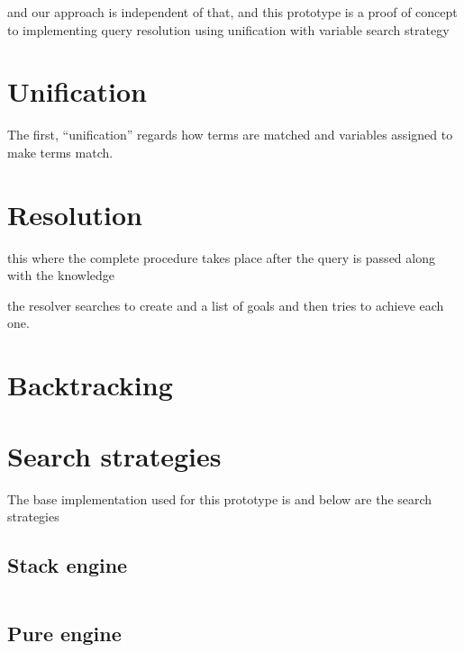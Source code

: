 \documentclass[thesis-solanki.tex]{files}
\begin{document}
and our approach is independent of that, and this prototype is a proof of concept to implementing query resolution using unification with
variable search strategy


\section{Unification}
The first, ``unification'' regards how terms are matched and variables assigned to make terms
match.
\cite{website:prologunification}



\section{Resolution}
this where the complete procedure takes place after the query is passed along with the knowledge 

the resolver searches to create and a list of  goals and then tries to achieve each one.

\cite{website:prologresolution}

\cite{website:resolutionlogicwiki}


\section{Backtracking}

\section{Search strategies}
The base implementation used for this prototype  is \cite{website:mini-prolog-hugs98} and below are the search
strategies
\subsection{Stack engine}
\begin{singlespace}
\inputminted[linenos, firstline=29, lastline=62]{haskell}{haskell-proto3-sudsy-woe.hs}
\end{singlespace}

\subsection{Pure engine}
\begin{singlespace}
\inputminted[linenos, firstline=26, lastline=46]{haskell}{haskell-proto3-absurd-silicon.hs}
\end{singlespace}
\end{document}
